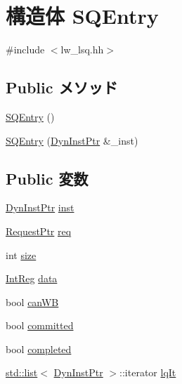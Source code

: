 \hypertarget{structOzoneLWLSQ_1_1SQEntry}{
\section{構造体 SQEntry}
\label{structOzoneLWLSQ_1_1SQEntry}
}


{\ttfamily \#include $<$lw\_\-lsq.hh$>$}\subsection*{Public メソッド}
\begin{DoxyCompactItemize}
\item 
\hyperlink{structOzoneLWLSQ_1_1SQEntry_a3e45ad78b5babe810aa50349be32637b}{SQEntry} ()
\item 
\hyperlink{structOzoneLWLSQ_1_1SQEntry_a3b163ba1f4e957334b0fe8a659562015}{SQEntry} (\hyperlink{classOzoneLWLSQ_a028ce10889c5f6450239d9e9a7347976}{DynInstPtr} \&\_\-inst)
\end{DoxyCompactItemize}
\subsection*{Public 変数}
\begin{DoxyCompactItemize}
\item 
\hyperlink{classOzoneLWLSQ_a028ce10889c5f6450239d9e9a7347976}{DynInstPtr} \hyperlink{structOzoneLWLSQ_1_1SQEntry_af5d4fb974eeb4507d4c837d365d0cefc}{inst}
\item 
\hyperlink{classRequest}{RequestPtr} \hyperlink{structOzoneLWLSQ_1_1SQEntry_a956cd41d82347558b9c0a5b0474903f2}{req}
\item 
int \hyperlink{structOzoneLWLSQ_1_1SQEntry_a439227feff9d7f55384e8780cfc2eb82}{size}
\item 
\hyperlink{classOzoneLWLSQ_a1355cb78d031430d4d70eb5080267604}{IntReg} \hyperlink{structOzoneLWLSQ_1_1SQEntry_a075dba7fb6badd5634e3d6f7da55c239}{data}
\item 
bool \hyperlink{structOzoneLWLSQ_1_1SQEntry_a2e445065a38a8a82256decf088cd3e6d}{canWB}
\item 
bool \hyperlink{structOzoneLWLSQ_1_1SQEntry_a28712f511a3687635fff96e084fdab9a}{committed}
\item 
bool \hyperlink{structOzoneLWLSQ_1_1SQEntry_a8c06e370b709d689e392a4b7b53b47c5}{completed}
\item 
\hyperlink{classstd_1_1list}{std::list}$<$ \hyperlink{classOzoneLWLSQ_a028ce10889c5f6450239d9e9a7347976}{DynInstPtr} $>$::iterator \hyperlink{structOzoneLWLSQ_1_1SQEntry_a2577e9f27485807aed8aa5e8602595d7}{lqIt}
\end{DoxyCompactItemize}
